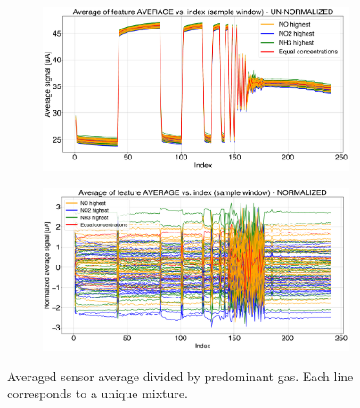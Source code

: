 \begin{figure}[!htb]
	\centering
	
	\begin{subfigure}[t]{1\textwidth}
		\includegraphics[width=1\linewidth]{../figures/order1.png}
		\caption{}
		\label{fig:order1} 
	\end{subfigure}
	
	\begin{subfigure}[t]{1\textwidth}
		\includegraphics[width=1\linewidth]{../figures/order1-norm.png}
		\caption{}
		\label{fig:order1norm}
	\end{subfigure}
	
	\caption{Averaged sensor average divided by predominant gas. Each line corresponds to a unique mixture. }
	\label{fig:order1-both}
\end{figure}

